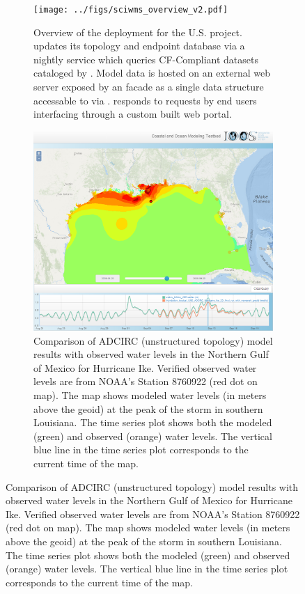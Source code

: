 \begin{figure}[ht!]
  \centering
  \begin{subfigure}[t]{0.49\columnwidth}
    \centering
    \texttt{[image: ../figs/sciwms\_overview\_v2.pdf]}
    \caption{Overview of the \sciwms{} deployment for the U.S. \ioos{}
      \comt{} project. \Sciwms{} updates its topology and endpoint
      database via a nightly service which queries CF-Compliant datasets
      cataloged by \ngdc{}. Model data is hosted on an external web
      server exposed by an \ncml{} facade as a single \netcdf{} data
      structure accessable to \sciwms{} via \opendap{}. \Sciwms{}
      responds to requests by end users interfacing through a custom built
      web portal.}
    \label{fig:overview1}
  \end{subfigure}
  \begin{subfigure}[t]{0.49\columnwidth}
    \centering
    \includegraphics[width=\columnwidth]{../figs/SciWMS_ModelObsComparison_crop_373_8_1052_879}
    \caption{Comparison of ADCIRC (unstructured topology) model results
      with observed water levels in the Northern Gulf of Mexico for
      Hurricane Ike. Verified observed water levels are from NOAA's
      Station 8760922 (red dot on map). The map shows modeled water
      levels (in meters above the geoid) at the peak of the storm in
      southern Louisiana. The time series plot shows both the modeled
      (green) and observed (orange) water levels. The vertical blue line
      in the time series plot corresponds to the current time of the
      map.}
    \label{fig:adcirc_comp}
  \end{subfigure}
\end{figure}

